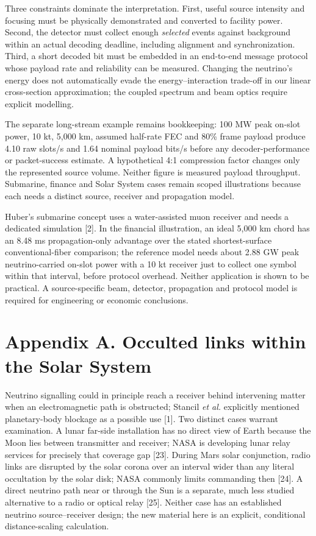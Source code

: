 \documentclass[
]{article}
\begin{document}
Three constraints dominate the interpretation. First, useful source
intensity and focusing must be physically demonstrated and converted to
facility power. Second, the detector must collect enough \emph{selected}
events against background within an actual decoding deadline, including
alignment and synchronization. Third, a short decoded bit must be
embedded in an end-to-end message protocol whose payload rate and
reliability can be measured. Changing the neutrino's energy does not
automatically evade the energy--interaction trade-off in our linear
cross-section approximation; the coupled spectrum and beam optics
require explicit modelling.

The separate long-stream example remains bookkeeping: 100 MW peak
on-slot power, 10 kt, 5,000 km, assumed half-rate FEC and 80\% frame
payload produce 4.10 raw slots/s and 1.64 nominal payload bits/s before
any decoder-performance or packet-success estimate. A hypothetical 4:1
compression factor changes only the represented source volume. Neither
figure is measured payload throughput. Submarine, finance and Solar
System cases remain scoped illustrations because each needs a distinct
source, receiver and propagation model.

Huber's submarine concept uses a water-assisted muon receiver and needs
a dedicated simulation {[}2{]}. In the financial illustration, an ideal
5,000 km chord has an 8.48 ms propagation-only advantage over the stated
shortest-surface conventional-fiber comparison; the reference model
needs about 2.88 GW peak neutrino-carried on-slot power with a 10 kt
receiver just to collect one symbol within that interval, before
protocol overhead. Neither application is shown to be practical. A
source-specific beam, detector, propagation and protocol model is
required for engineering or economic conclusions.

\hypertarget{appendix-a.-occulted-links-within-the-solar-system}{%
\section{Appendix A. Occulted links within the Solar
System}\label{appendix-a.-occulted-links-within-the-solar-system}}

Neutrino signalling could in principle reach a receiver behind
intervening matter when an electromagnetic path is obstructed; Stancil
\emph{et al.} explicitly mentioned planetary-body blockage as a possible
use {[}1{]}. Two distinct cases warrant examination. A lunar far-side
installation has no direct view of Earth because the Moon lies between
transmitter and receiver; NASA is developing lunar relay services for
precisely that coverage gap {[}23{]}. During Mars solar conjunction,
radio links are disrupted by the solar corona over an interval wider
than any literal occultation by the solar disk; NASA commonly limits
commanding then {[}24{]}. A direct neutrino path near or through the Sun
is a separate, much less studied alternative to a radio or optical relay
{[}25{]}. Neither case has an established neutrino source--receiver
design; the new material here is an explicit, conditional
distance-scaling calculation.
\end{document}
